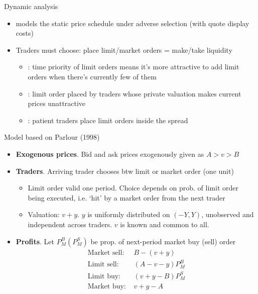 \documentclass[english,10pt]{beamer}
\begin{document}
\begin{frame}{Dynamic analysis}
	\begin{itemize}
		\item \cite{glosten_is_1994} models the static price schedule under adverse selection (with quote display costs)
		\item Traders must choose: place limit/market orders = make/take liquidity
		\begin{itemize}
			\item \cite{parlour_price_1998}: time priority of limit orders means it's more attractive to add limit orders when there's currently few of them
			\item \cite{foucault_order_1999}: limit order placed by traders whose private valuation makes current prices unattractive
			\item \citet*{foucault_limit_2005}: patient traders place limit orders inside the spread
		\end{itemize}
	\end{itemize}
\end{frame}


\begin{frame}{Model based on Parlour (1998)}
	\begin{itemize}
		\item \textbf{Exogenous prices}. Bid and ask prices exogenously given as $A>v>B$
		\item \textbf{Traders}. Arriving trader chooses btw limit or market order (one unit)
		\begin{itemize}
			\item Limit order valid one period. Choice depends on prob. of limit order being executed, i.e. `hit' by a market order from the next trader
			\item Valuation: $v+y$. $y$ is uniformly distributed on $(-Y,Y)$, unobserved and independent across traders. $v$ is known and common to all.
		\end{itemize}
		\item \textbf{Profits}. Let $P^B_M (P^S_M)$ be prop. of next-period market buy (sell) order 
		\begin{align*}
		\text{Market sell: } & B-(v+y) \\
		\text{Limit sell: } & (A-v-y)P^B_M \\
		\text{Limit buy: } &(v+y-B)P^S_M \\
		\text{Market buy: } &v+y-A
		\end{align*}
	\end{itemize}
\end{frame}
\end{document}
